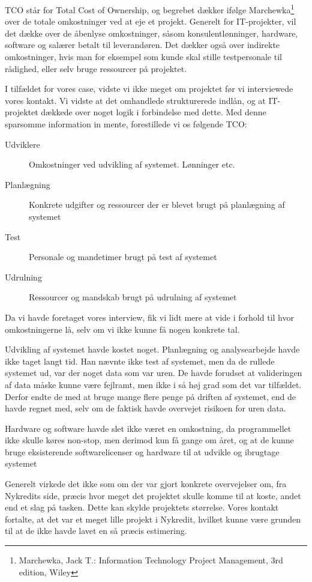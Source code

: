TCO står for Total Cost of Ownership, og begrebet dækker ifølge
Marchewka\footnote{Marchewka, Jack T.: Information Technology Project
Management, 3rd edition, Wiley} over de totale omkostninger ved at eje et
projekt. Generelt for IT-projekter, vil det dække over de åbenlyse omkostninger,
såsom konsulentlønninger, hardware, software og salærer betalt til leverandøren.
Det dækker også over indirekte omkostninger, hvis man for eksempel som kunde
skal stille testpersonale til rådighed, eller selv bruge ressourcer på
projektet.

I tilfældet for vores case, vidste vi ikke meget om projektet før vi
interviewede vores kontakt. Vi vidste at det omhandlede strukturerede indlån, og
at IT-projektet dækkede over noget logik i forbindelse med dette. Med denne
sparsomme information in mente, forestillede vi os følgende TCO:

\begin{description}
  \item[Udviklere]
  Omkostninger ved udvikling af systemet. Lønninger etc.
  \item[Planlægning]
  Konkrete udgifter og ressourcer der er blevet brugt på planlægning af systemet
  \item[Test]
  Personale og mandetimer brugt på test af systemet
  \item[Udrulning]
  Ressourcer og mandskab brugt på udrulning af systemet
\end{description}

Da vi havde foretaget vores interview, fik vi lidt mere at vide i forhold til
hvor omkostningerne lå, selv om vi ikke kunne få nogen konkrete tal.

Udvikling af systemet havde kostet noget. Planlægning og analysearbejde havde
ikke taget langt tid. Han nævnte ikke test af systemet, men da de rullede
systemet ud, var der noget data som var uren. De havde forudset at valideringen
af data måske kunne være fejlramt, men ikke i så høj grad som det var tilfældet.
Derfor endte de med at bruge mange flere penge på driften af systemet, end de
havde regnet med, selv om de faktisk havde overvejet risikoen for uren data.

Hardware og software havde slet ikke været en omkostning, da programmellet ikke
skulle køres non-stop, men derimod kun få gange om året, og at de kunne bruge
eksisterende softwarelicenser og hardware til at udvikle og ibrugtage systemet

Generelt virkede det ikke som om der var gjort konkrete overvejelser om, fra
Nykredits side, præcis hvor meget det projektet skulle komme til at koste, andet
end et slag på tasken.  Dette kan skylde projektets størrelse. Vores kontakt
fortalte, at det var et meget lille projekt i Nykredit, hvilket kunne være
grunden til at de ikke havde lavet en så præcis estimering.

